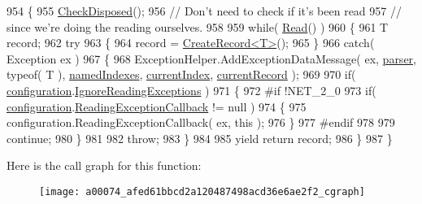 \begin{DoxyCode}
954         \{
955             \hyperlink{a00074_a6fa45a46ed1322dc1872ca2321b5edbc}{CheckDisposed}();
956             \textcolor{comment}{// Don't need to check if it's been read}
957             \textcolor{comment}{// since we're doing the reading ourselves.}
958 
959             \textcolor{keywordflow}{while}( \hyperlink{a00074_af1f0d4d722e93df9da30fe60b89ff2d6}{Read}() )
960             \{
961                 T record;
962                 \textcolor{keywordflow}{try}
963                 \{
964                     record = \hyperlink{a00074_aadbd9b18761654925be4bed3b906faa1}{CreateRecord<T>}();
965                 \}
966                 \textcolor{keywordflow}{catch}( Exception ex )
967                 \{
968                     ExceptionHelper.AddExceptionDataMessage( ex, \hyperlink{a00074_aaf2ee64c7a157027aea69bfae1fa9edc}{parser}, typeof( T ), 
      \hyperlink{a00074_a3114f49bd2b3c4966f4b15a310747aeb}{namedIndexes}, \hyperlink{a00074_a56e974bc7e2242912e956393e831e166}{currentIndex}, \hyperlink{a00074_ab2bfef15784add66e441c9d3a0d73751}{currentRecord} );
969 
970                     \textcolor{keywordflow}{if}( \hyperlink{a00074_a695622911e45cbac8d67dcbd9a3e2967}{configuration}.\hyperlink{a00060_a8645dbd4fe2a9c443910695a93b1027f}{IgnoreReadingExceptions} )
971                     \{
972 \textcolor{preprocessor}{#if !NET\_2\_0
}
973 \textcolor{preprocessor}{}                        \textcolor{keywordflow}{if}( \hyperlink{a00074_a695622911e45cbac8d67dcbd9a3e2967}{configuration}.\hyperlink{a00060_ae7257970a1b5bfb9f2ddfdc61a70fe34}{ReadingExceptionCallback} != 
      null )
974                         \{
975                             configuration.ReadingExceptionCallback( ex, this );
976                         \}
977 \textcolor{preprocessor}{#endif
}
978 \textcolor{preprocessor}{}
979                         \textcolor{keywordflow}{continue};
980                     \}
981 
982                     \textcolor{keywordflow}{throw};
983                 \}
984 
985                 yield \textcolor{keywordflow}{return} record;
986             \}
987         \}
\end{DoxyCode}


Here is the call graph for this function\-:
\nopagebreak
\begin{figure}[H]
\begin{center}
\leavevmode
\texttt{[image: a00074\_afed61bbcd2a120487498acd36e6ae2f2\_cgraph]}
\end{center}
\end{figure}


